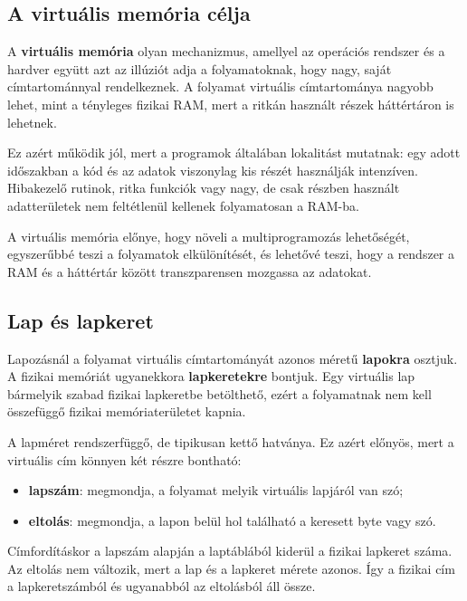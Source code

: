 \subsection{A virtuális memória célja}

A \textbf{virtuális memória} olyan mechanizmus, amellyel az operációs rendszer és a hardver együtt azt az illúziót adja a folyamatoknak, hogy nagy, saját címtartománnyal rendelkeznek. A folyamat virtuális címtartománya nagyobb lehet, mint a tényleges fizikai RAM, mert a ritkán használt részek háttértáron is lehetnek.

Ez azért működik jól, mert a programok általában lokalitást mutatnak: egy adott időszakban a kód és az adatok viszonylag kis részét használják intenzíven. Hibakezelő rutinok, ritka funkciók vagy nagy, de csak részben használt adatterületek nem feltétlenül kellenek folyamatosan a RAM-ba.



A virtuális memória előnye, hogy növeli a multiprogramozás lehetőségét, egyszerűbbé teszi a folyamatok elkülönítését, és lehetővé teszi, hogy a rendszer a RAM és a háttértár között transzparensen mozgassa az adatokat.

\subsection{Lap és lapkeret}

Lapozásnál a folyamat virtuális címtartományát azonos méretű \textbf{lapokra} osztjuk. A fizikai memóriát ugyanekkora \textbf{lapkeretekre} bontjuk. Egy virtuális lap bármelyik szabad fizikai lapkeretbe betölthető, ezért a folyamatnak nem kell összefüggő fizikai memóriaterületet kapnia.

A lapméret rendszerfüggő, de tipikusan kettő hatványa. Ez azért előnyös, mert a virtuális cím könnyen két részre bontható:

\begin{itemize}
  \item \textbf{lapszám}: megmondja, a folyamat melyik virtuális lapjáról van szó;
  \item \textbf{eltolás}: megmondja, a lapon belül hol található a keresett byte vagy szó.
\end{itemize}



Címfordításkor a lapszám alapján a laptáblából kiderül a fizikai lapkeret száma. Az eltolás nem változik, mert a lap és a lapkeret mérete azonos. Így a fizikai cím a lapkeretszámból és ugyanabból az eltolásból áll össze.

